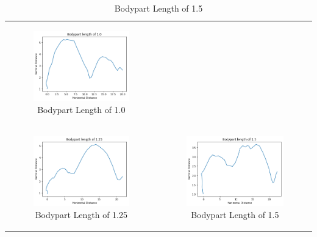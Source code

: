 \documentclass[12pt,oneside,listof=totoc,paper=a4,headings=small]{scrbook}
\begin{document}
{\begin{table}[h!]
\begin{tabular}{cc}
\begin{subfigure}{0.4\textwidth}\centering\includegraphics[width=0.75\columnwidth]{images/length_10.png}\caption{Bodypart Length of 1.0}\label{fig:lengthtabd}\end{subfigure}\\
\newline
\begin{subfigure}{0.4\textwidth}\centering\includegraphics[width=0.75\columnwidth]{images/length_125.png}\caption{Bodypart Length of 1.25}\label{fig:lengthtabe}\end{subfigure}&
\begin{subfigure}{0.4\textwidth}\centering\includegraphics[width=0.75\columnwidth]{images/length_15.png}\caption{Bodypart Length of 1.5}\label{fig:lengthtabf}\end{subfigure}\\

\end{tabular}
\end{table}}
\end{document}
